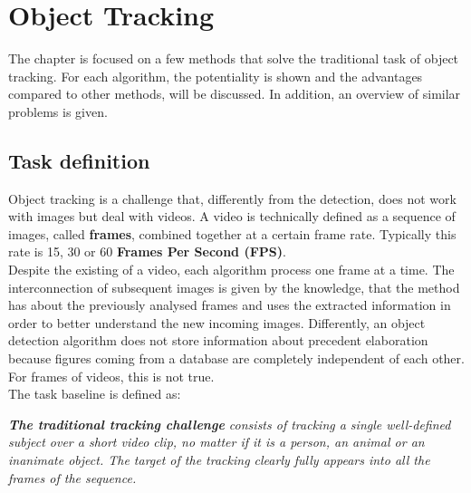 \chapter{Object Tracking} \label{cha:tracking}
The chapter is focused on a few methods that solve the traditional task of object tracking. For each algorithm, the potentiality is shown and the advantages compared to other methods, will be discussed. In addition, an overview of similar problems is given.



\section{Task definition} \label{sec:tracking-definition}
Object tracking is a challenge that, differently from the detection, does not work with images but deal with videos. A video is technically defined as a sequence of images, called \textbf{frames}, combined together at a certain frame rate. Typically this rate is 15, 30 or 60 \textbf{Frames Per Second (FPS)}.\\
Despite the existing of a video, each algorithm process one frame at a time. The interconnection of subsequent images is given by the knowledge, that the method has about the previously analysed frames and uses the extracted information in order to better understand the new incoming images. Differently, an object detection algorithm does not store information about precedent elaboration because figures coming from a database are completely independent of each other. For frames of videos, this is not true.\\
The task baseline is defined as:
\begin{tcolorbox}
	\begin{center}
		\textit{\textbf{The traditional tracking challenge} consists of tracking a single well-defined subject over a short video clip, no matter if it is a person, an animal or an inanimate object. The target of the tracking clearly fully appears into all the frames of the sequence.}
	\end{center}
\end{tcolorbox}


